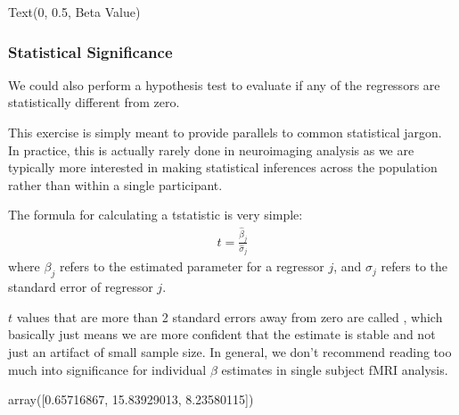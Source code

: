 \documentclass[letterpaper,10pt,english]{sphinxmanual}
\begin{document}
\begin{sphinxVerbatim}[commandchars=\\\{\}]
Text(0, 0.5, \PYGZsq{}Beta Value\PYGZsq{})
\end{sphinxVerbatim}

\noindent{}


\subsubsection{Statistical Significance}
\label{\detokenize{content/GLM:statistical-significance}}
We could also perform a hypothesis test to evaluate if any of the regressors are statistically different from zero.

This exercise is simply meant to provide parallels to common statistical jargon. In practice, this is actually rarely done in neuroimaging analysis as we are typically more interested in making statistical inferences across the population rather than within a single participant.

The formula for calculating a t\sphinxhyphen{}statistic is very simple:
\begin{equation*}
\begin{split}t = \frac{\hat \beta_j}{\hat \sigma_j}\end{split}
\end{equation*}
where \(\beta_j\) refers to the estimated parameter for a regressor \(j\), and \(\sigma_j\) refers to the standard error of regressor \(j\).

\(t\) values that are more than 2 standard errors away from zero are called , which basically just means we are more confident that the estimate is stable and not just an artifact of small sample size. In general, we don’t recommend reading too much into significance for individual \(\beta\) estimates in single subject fMRI analysis.

\begin{sphinxVerbatim}[commandchars=\\\{\}]
  
\end{sphinxVerbatim}

\begin{sphinxVerbatim}[commandchars=\\\{\}]
array([\PYGZhy{}0.65716867, 15.83929013,  8.23580115])
\end{sphinxVerbatim}
\end{document}
